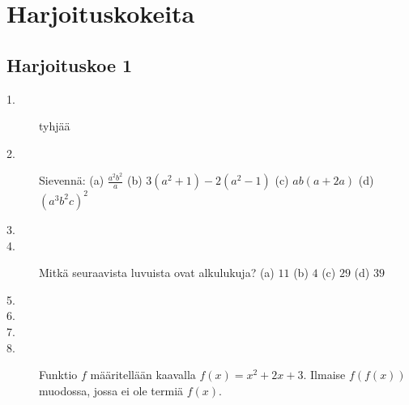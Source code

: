 \chapter{Harjoituskokeita}

\section*{Harjoituskoe 1}

\begin{description}
	\item[1.] tyhjää
	\item[2.] Sievennä: (a) $\frac{a^2 b^2}{a}$ (b) $3(a^2+1)-2(a^2-1)$ (c) $ab(a+2a)$ (d) $(a^3 b^2 c)^2$
	\item[3.]
	\item[4.] Mitkä seuraavista luvuista ovat alkulukuja? (a) $11$ (b) $4$ (c) $29$ (d) $39$
	\item[5.]
	\item[6.] 
	\item[7.] 
	\item[8.] Funktio $f$ määritellään kaavalla $f(x) = x^2 + 2x + 3$. Ilmaise $f(f(x))$ muodossa, jossa ei ole termiä $f(x)$.
\end{description}
